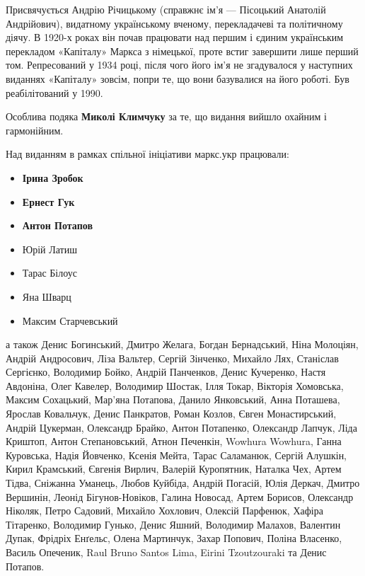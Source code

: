 
Присвячується Андрію Річицькому (справжнє ім'я — Пісоцький Анатолій Андрійович), видатному українському вченому, перекладачеві та політичному діячу. В 1920-х роках він почав працювати над першим і єдиним українським перекладом «Капіталу» Маркса з німецької, проте встиг завершити лише перший том. Репресований у 1934 році, після чого його ім’я не згадувалося у наступних виданнях «Капіталу» зовсім, попри те, що вони базувалися на його роботі. Був реабілітований у 1990. 


\noindent{}Особлива подяка \textbf{Миколі Климчуку} за те,
що видання вийшло охайним і гармонійним. 

\smallskip
\noindent{}Над виданням в рамках спільної ініціативи маркс.укр працювали:
\begin{itemize}[nosep]
\item \textbf{Ірина Зробок}
\item \textbf{Ернест Гук}
\item \textbf{Антон Потапов}
\item Юрій Латиш
\item Тарас Білоус
\item Яна Шварц
\item Максим Старчевський
\end{itemize}
\noindent{}а також
Денис Богинський,
Дмитро Желага,
Богдан Бернадський,
Ніна Молоціян,
Андрій Андросович,
Ліза Вальтер,
Сергій Зінченко,
Михайло Лях,
Станіслав Сергієнко,
Володимир Бойко,
Андрій Панченков,
Денис Кучеренко,
Настя Авдоніна,
Олег Кавелер,
Володимир Шостак,
Ілля Токар,
Вікторія Хомовська,
Максим Сохацький,
Мар'яна Потапова,
Данило Янковський,
Анна Поташева,
Ярослав Ковальчук,
Денис Панкратов,
Роман Козлов,
Євген Монастирський,
Андрій Цукерман,
Олександр Брайко,
Антон Потапенко,
Олександр Лапчук,
Ліда Криштоп,
Антон Степановський,
Атнон Печенкін,
Wowhura Wowhura,
Ганна Куровська,
Надія Йовченко,
Ксенія Мейта,
Тарас Саламанюк,
Сергій Алушкін,
Кирил Крамський,
Євгенія Вирлич,
Валерій Куропятник,
Наталка Чех,
Артем Тідва,
Сніжанна Уманець,
Любов Куйбіда,
Андрій Погасій,
Юлія Деркач,
Дмитро Вершинін,
Леонід Бігунов-Новіков,
Галина Новосад,
Артем Борисов,
Олександр Ніколяк,
Петро Садовий,
Михайло Хохлович,
Олексій Парфенюк,
Хафіра Тітаренко,
Володимир Гунько,
Денис Яшний,
Володимир Малахов,
Валентин Дупак,
Фрідріх Енґельс,
Олена Мартинчук,
Захар Попович,
Поліна Власенко,
Василь Опеченик,
Raul Bruno Santos Lima,
Eirini Tzoutzouraki та Денис Потапов.


\cleardoublepage
